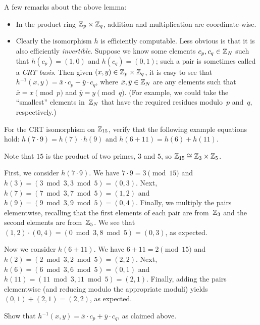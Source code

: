 \documentclass[11pt]{article}
\begin{document}
\noindent A few remarks about the above lemma:
\begin{itemize}
\item In the product ring $\mathbb{Z}_p \times \mathbb{Z}_q$, addition and
  multiplication are coordinate-wise.
\item Clearly the isomorphism $h$ is efficiently computable.  Less
  obvious is that it is also efficiently \emph{invertible}.  Suppose
  we know some elements $c_{p}, c_{q} \in \mathbb{Z}_N$ such that
  $h(c_{p}) = (1,0)$ and $h(c_{q}) = (0,1)$; such a pair is sometimes
  called a \emph{CRT basis}.  Then given $(x,y) \in \mathbb{Z}_p \times \mathbb{Z}_q$,
  it is easy to see that
  $h^{-1}(x,y) = \bar{x} \cdot c_{p} + \bar{y} \cdot c_{q}$, where
  $\bar{x}, \bar{y} \in \mathbb{Z}_N$ are any elements such that
  $\bar{x} = x \pmod{p}$ and $\bar{y} = y \pmod{q}$. (For example, we
  could take the ``smallest'' elements in~$\mathbb{Z}_N$ that have the required
  residues modulo~$p$ and~$q$, respectively.)
\end{itemize}

\begin{question}
  For the CRT isomorphism on $\mathbb{Z}_{15}$, verify that the following
  example equations hold: $h(7 \cdot 9) = h(7) \cdot h(9)$ and
  $h(6 + 11) = h(6) + h(11)$.
\end{question}

\begin{answer}
  Note that $15$ is the product of two primes, $3$ and $5$, so
  \(\mathbb{Z}_{15} \cong \mathbb{Z}_3 \times \mathbb{Z}_5\).

  First, we consider \(h(7 \cdot 9)\). We have
  \(7 \cdot 9 = 3 \pmod{15}\) and
  \(h(3) = (3 \bmod 3, 3 \bmod 5) = (0, 3)\). Next,
  \(h(7) = (7 \bmod{3}, 7 \bmod{5}) = (1,2)\) and
  \(h(9) = (9 \bmod{3}, 9 \bmod 5) = (0, 4)\). Finally, we multiply
  the pairs elementwise, recalling that the first elements of each
  pair are from~\(\mathbb{Z}_3\) and the second elements are from~\(\mathbb{Z}_5\). We
  see that \((1,2) \cdot (0,4) = (0 \bmod 3, 8 \bmod 5) = (0,3)\), as
  expected.

  Now we consider \(h(6 + 11)\). We have \(6 + 11 = 2 \pmod{15}\) and
  \(h(2) = (2 \bmod 3, 2 \bmod 5) = (2,2)\). Next,
  \(h(6) = (6 \bmod{3}, 6 \bmod{5}) = (0,1)\) and
  \(h(11) = (11 \bmod{3}, 11 \bmod{5}) = (2,1)\). Finally, adding the
  pairs elementwise (and reducing modulo the appropriate moduli)
  yields \((0,1) + (2,1) = (2,2)\), as expected.
\end{answer}

\begin{question}
  Show that \(h^{-1}(x,y) = \bar{x} \cdot c_p + \bar{y} \cdot c_q\),
  as claimed above.
\end{question}
\end{document}
